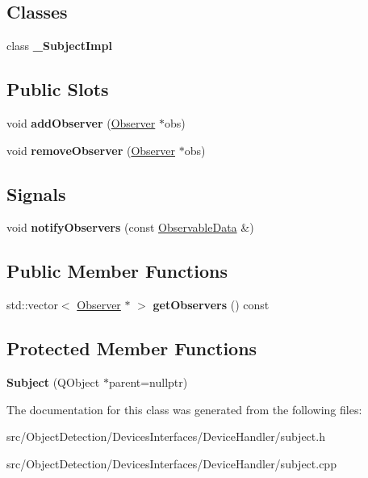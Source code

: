 \subsection*{Classes}
\begin{DoxyCompactItemize}
\item 
class {\bfseries \+\_\+\+Subject\+Impl}
\end{DoxyCompactItemize}
\subsection*{Public Slots}
\begin{DoxyCompactItemize}
\item 
\mbox{\label{class_devices_1_1_subject_a7aec3567898fc9bbebdeba8a335029f4}} 
void {\bfseries add\+Observer} (\hyperlink{class_devices_1_1_observer}{Observer} $\ast$obs)
\item 
\mbox{\label{class_devices_1_1_subject_a7cb918292445a292263e2e0f8e74903d}} 
void {\bfseries remove\+Observer} (\hyperlink{class_devices_1_1_observer}{Observer} $\ast$obs)
\end{DoxyCompactItemize}
\subsection*{Signals}
\begin{DoxyCompactItemize}
\item 
\mbox{\label{class_devices_1_1_subject_a715b3a4513893d294229ee76f2ed3cbe}} 
void {\bfseries notify\+Observers} (const \hyperlink{class_devices_1_1_observable_data}{Observable\+Data} \&)
\end{DoxyCompactItemize}
\subsection*{Public Member Functions}
\begin{DoxyCompactItemize}
\item 
\mbox{\label{class_devices_1_1_subject_adbc2b175f510857715682e571851b215}} 
std\+::vector$<$ \hyperlink{class_devices_1_1_observer}{Observer} $\ast$ $>$ {\bfseries get\+Observers} () const
\end{DoxyCompactItemize}
\subsection*{Protected Member Functions}
\begin{DoxyCompactItemize}
\item 
\mbox{\label{class_devices_1_1_subject_ac78bedb24be6afb83b4fa334badc549b}} 
{\bfseries Subject} (Q\+Object $\ast$parent=nullptr)
\end{DoxyCompactItemize}


The documentation for this class was generated from the following files\+:\begin{DoxyCompactItemize}
\item 
src/\+Object\+Detection/\+Devices\+Interfaces/\+Device\+Handler/subject.\+h\item 
src/\+Object\+Detection/\+Devices\+Interfaces/\+Device\+Handler/subject.\+cpp\end{DoxyCompactItemize}
